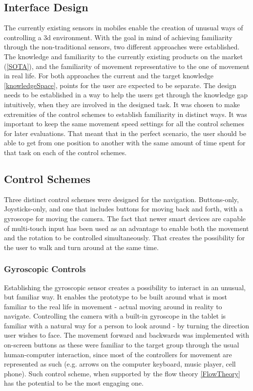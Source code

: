 \subsection{Interface Design}
The currently existing sensors in mobiles enable the creation of unusual ways of controlling a 3d environment. With the goal in mind of achieving familiarity through the non-traditional sensors, two different approaches were established. The knowledge and familiarity to the currently existing products on the market (\ref{SOTA}), and the familiarity of movement representative to the one of movement in real life. For both approaches the current and the target knowledge \ref{knowledgeSpace}, points for the user are expected to be separate. The design needs to be established in a way to help the users get through the knowledge gap intuitively, when they are involved in the designed task. It was chosen to make extremities of the control schemes to establish familiarity in distinct ways. It was important to keep the same movement speed settings for all the control schemes for later evaluations. That meant that in the perfect scenario, the user should be able to get from one position to another with the same amount of time spent for that task on each of the control schemes.

\subsection{Control Schemes}
Three distinct control schemes were designed for the navigation. Buttons-only, Joysticks-only, and one that includes buttons for moving back and forth, with a gyroscope for moving the camera. The fact that newer smart devices are capable of multi-touch input has been used as an advantage to enable both the movement and the rotation to be controlled simultaneously. That creates the possibility for the user to walk and turn around at the same time.

\subsubsection{Gyroscopic Controls}
Establishing the gyroscopic sensor creates a possibility to interact in an unusual, but familiar way. It enables the prototype to be built around what is most familiar to the real life in movement - actual moving around in reality to navigate.
Controlling the camera with a built-in gyroscope in the tablet is familiar with a natural way for a person to look around - by turning the direction user wishes to face. The movement forward and backwards was implemented with on-screen buttons as these were familiar to the target group through the usual human-computer interaction, since most of the controllers for movement are represented as such (e.g. arrows on the computer keyboard, music player, cell phone).
Such control scheme, when supported by the flow theory \ref{FlowTheory} has the potential to be the most engaging one.

